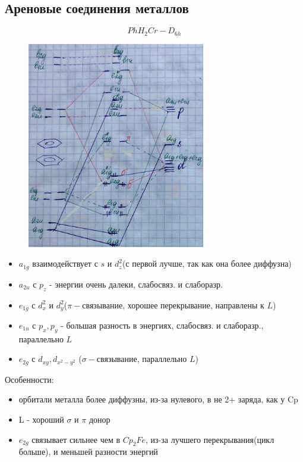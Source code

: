 \subsection{Ареновые соединения металлов}
$$PhH_2Cr - D_{6h}$$

\begin{figure}[htp]
\centering
\includegraphics[scale=1.00]{images/DBCrome.png}
\end{figure}

\begin{itemize}
\item $a_{1g}$ взаимодействует с $s$ и $d_z^2$(с первой лучше, так как она более диффузна)
\item $a_{2u}$ с $p_z$ - энергии очень далеки, слабосвяз. и слаборазр.
\item $e_{1g}$ с $d_x^2$ и $d_y^2$($\pi-$связывание, хорошее перекрывание, направлены к $L$)
\item $e_{1u}$ с $p_x, p_y$ - большая разность в энергиях, слабосвяз. и слаборазр., параллельно $L$
\item $e_{2g}$ с $d_{xy}, d_{x^2-y^2}$ ($\sigma-$связывание, параллельно $L$)
\end{itemize}
Особенности:
\begin{itemize}
\item орбитали металла более диффузны, из-за нулевого, в не 2+ заряда, как у Cp
\item L - хороший $\sigma$ и $\pi$ донор
\item $e_{2g}$ связывает сильнее чем в $Cp_2Fe$, из-за лучшего перекрывания(цикл больше), и меньшей разности энергий
\end{itemize}